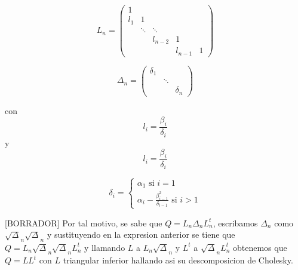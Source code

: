 \documentclass{article}
\begin{document}
    \begin{equation*}
        L_{n} = \begin{pmatrix} 
                1   &        &         &         &   \\ 
                l_1 &   1    &         &         &   \\
                    & \ddots & \ddots  &         &   \\
                    &        & l_{n-2} &    1    &   \\
                    &        &         & l_{n-1} & 1
            \end{pmatrix}
    \end{equation*}

    \begin{equation*}
        \Delta_n = \begin{pmatrix} 
                \delta_1 &        &          \\ 
                         & \ddots &          \\
                         &        & \delta_n
            \end{pmatrix}
    \end{equation*}

    con \begin{equation} l_i = \frac{\beta_i}{\delta_i} \end{equation}
    y \begin{equation} l_i = \frac{\beta_i}{\delta_i} \end{equation}

    \begin{equation}
        \delta_i =
            \begin{cases}
                \alpha_1 \text{ si } i = 1 \\
                \alpha_i - \frac{\beta_{i-1}^2}{\delta_{i-1}} \text{ si } i>1
            \end{cases}
    \end{equation}

    [BORRADOR] Por tal motivo, se sabe que $ Q = L_n\Delta_nL_{n}^{t} $,
    escribamos $\Delta_n$ como $\sqrt\Delta_n\sqrt\Delta_n$ y sustituyendo en la expresion anterior se tiene que
    $ Q = L_n\sqrt\Delta_n\sqrt\Delta_nL_{n}^{t} $ y llamando $L$ a $L_n\sqrt\Delta_n$ y $L^t$ a $\sqrt\Delta_nL_{n}^{t}$
    obtenemos que $Q = LL^t$ con $L$ triangular inferior hallando asi su descomposicion de Cholesky.

    \subsection{}
\end{document}

